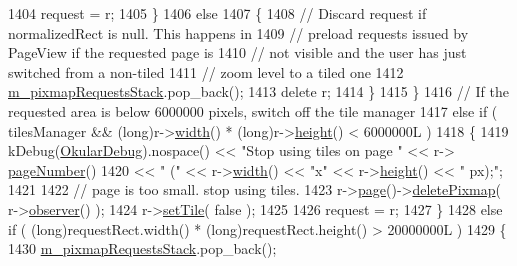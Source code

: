 \begin{DoxyCode}
1404                 request = r;
1405             \}
1406             \textcolor{keywordflow}{else}
1407             \{
1408                 \textcolor{comment}{// Discard request if normalizedRect is null. This happens in}
1409                 \textcolor{comment}{// preload requests issued by PageView if the requested page is}
1410                 \textcolor{comment}{// not visible and the user has just switched from a non-tiled}
1411                 \textcolor{comment}{// zoom level to a tiled one}
1412                 \hyperlink{classOkular_1_1DocumentPrivate_af903e531960617af53b4bc79b3a95efa}{m\_pixmapRequestsStack}.pop\_back();
1413                 \textcolor{keyword}{delete} r;
1414             \}
1415         \}
1416         \textcolor{comment}{// If the requested area is below 6000000 pixels, switch off the tile manager}
1417         \textcolor{keywordflow}{else} \textcolor{keywordflow}{if} ( tilesManager && (\textcolor{keywordtype}{long})r->\hyperlink{classOkular_1_1PixmapRequest_a3e82f09b91a52efed7435eeb9903e5fc}{width}() * (long)r->\hyperlink{classOkular_1_1PixmapRequest_a782392a2efc6303994c7e0158c76ee06}{height}() < 6000000L )
1418         \{
1419             kDebug(\hyperlink{debug__p_8h_af16c6e32a95969dd0605d792ec9807c7}{OkularDebug}).nospace() << \textcolor{stringliteral}{"Stop using tiles on page "} << r->
      \hyperlink{classOkular_1_1PixmapRequest_a50f959175182137dbb9e2dbd6ddd71aa}{pageNumber}()
1420                 << \textcolor{stringliteral}{" ("} << r->\hyperlink{classOkular_1_1PixmapRequest_a3e82f09b91a52efed7435eeb9903e5fc}{width}() << \textcolor{stringliteral}{"x"} << r->\hyperlink{classOkular_1_1PixmapRequest_a782392a2efc6303994c7e0158c76ee06}{height}() << \textcolor{stringliteral}{" px);"};
1421 
1422             \textcolor{comment}{// page is too small. stop using tiles.}
1423             r->\hyperlink{classOkular_1_1PixmapRequest_a83b5e81f2e908e70f3c19a0a3c07fab3}{page}()->\hyperlink{classOkular_1_1Page_a173c54714b3edd09a96175fabd8f756d}{deletePixmap}( r->\hyperlink{classOkular_1_1PixmapRequest_af7abb325ca484ded40c556cf0ad5b793}{observer}() );
1424             r->\hyperlink{classOkular_1_1PixmapRequest_a386e7798833195f24d9598f696de8f73}{setTile}( \textcolor{keyword}{false} );
1425 
1426             request = r;
1427         \}
1428         \textcolor{keywordflow}{else} \textcolor{keywordflow}{if} ( (\textcolor{keywordtype}{long})requestRect.width() * (long)requestRect.height() > 20000000L )
1429         \{
1430             \hyperlink{classOkular_1_1DocumentPrivate_af903e531960617af53b4bc79b3a95efa}{m\_pixmapRequestsStack}.pop\_back();

\end{DoxyCode}
